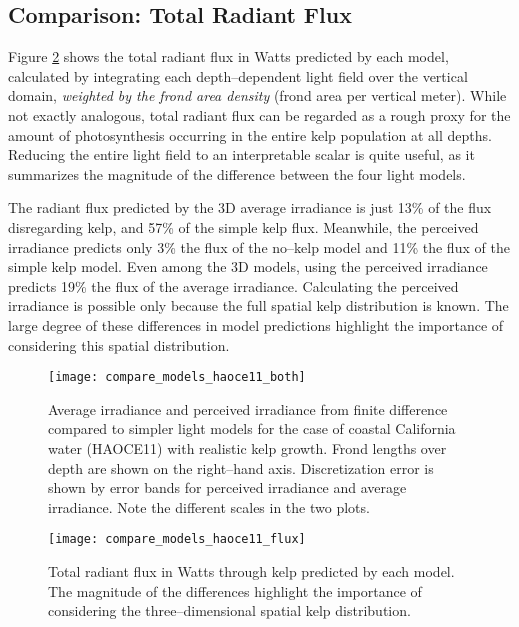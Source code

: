 \subsection{Comparison: Total Radiant Flux}
Figure \ref{fig:compare_models_haoce11_flux} shows the total radiant flux in Watts predicted by each model, calculated by integrating each depth--dependent light field over the vertical domain, \textit{weighted by the frond area density} (frond area per vertical meter).
While not exactly analogous, total radiant flux can be regarded as a rough proxy for the amount of photosynthesis occurring in the entire kelp population at all depths.
Reducing the entire light field to an interpretable scalar is quite useful, as it summarizes the magnitude of the difference between the four light models.

The radiant flux predicted by the 3D average irradiance is just 13\% of the flux disregarding kelp, and 57\% of the simple kelp flux.
Meanwhile, the perceived irradiance predicts only 3\% the flux of the no--kelp model and 11\% the flux of the simple kelp model.
Even among the 3D models, using the perceived irradiance predicts 19\% the flux of the average irradiance.
Calculating the perceived irradiance is possible only because the full spatial kelp distribution is known.
The large degree of these differences in model predictions highlight the importance of considering this spatial distribution.

\begin{figure}[H]
  \centering
  \texttt{[image: compare\_models\_haoce11\_both]}
  \caption{Average irradiance and perceived irradiance from finite difference compared to simpler light models for the case of coastal California water (HAOCE11) with realistic kelp growth. Frond lengths over depth are shown on the right--hand axis. Discretization error is shown by error bands for perceived irradiance and average irradiance. Note the different scales in the two plots.}
  \label{fig:compare_models_haoce11_both}
\end{figure}

\begin{figure}[H]
  \centering
  \texttt{[image: compare\_models\_haoce11\_flux]}
  \caption{Total radiant flux in Watts through kelp predicted by each model. The magnitude of the differences highlight the importance of considering the three--dimensional spatial kelp distribution.}
  \label{fig:compare_models_haoce11_flux}
\end{figure}


